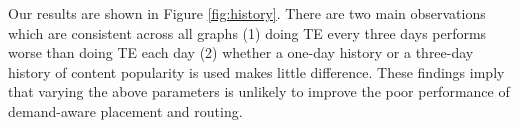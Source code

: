 {Our results are shown in Figure \ref{fig:history}. There are two main observations which are consistent across all graphs (1) doing TE every three days performs worse than doing TE each day (2) whether a one-day history  or a three-day history of content popularity is used makes little difference.  These findings imply that varying the above parameters is unlikely to improve the  poor performance of demand-aware placement and routing.


\begin{figure}[t]
\begin{center}

\end{center}
\end{figure}}
